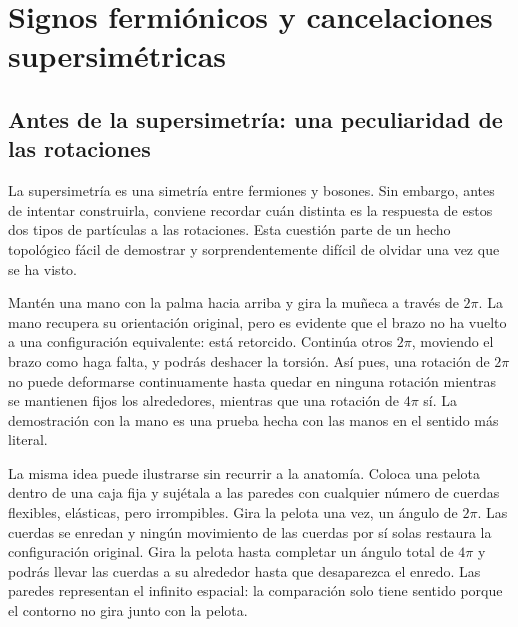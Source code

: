 \chapter{Signos fermiónicos y cancelaciones supersimétricas}


\section{Antes de la supersimetría: una peculiaridad de las rotaciones}

La supersimetría es una simetría entre fermiones y bosones. Sin embargo, antes de intentar construirla, conviene recordar cuán distinta es la respuesta de estos dos tipos de partículas a las rotaciones. Esta cuestión parte de un hecho topológico fácil de demostrar y sorprendentemente difícil de olvidar una vez que se ha visto.

Mantén una mano con la palma hacia arriba y gira la muñeca a través de \(2\pi\). La mano recupera su orientación original, pero es evidente que el brazo no ha vuelto a una configuración equivalente: está retorcido. Continúa otros \(2\pi\), moviendo el brazo como haga falta, y podrás deshacer la torsión. Así pues, una rotación de \(2\pi\) no puede deformarse continuamente hasta quedar en ninguna rotación mientras se mantienen fijos los alrededores, mientras que una rotación de \(4\pi\) sí. La demostración con la mano es una prueba hecha con las manos en el sentido más literal.

La misma idea puede ilustrarse sin recurrir a la anatomía. Coloca una pelota dentro de una caja fija y sujétala a las paredes con cualquier número de cuerdas flexibles, elásticas, pero irrompibles. Gira la pelota una vez, un ángulo de \(2\pi\). Las cuerdas se enredan y ningún movimiento de las cuerdas por sí solas restaura la configuración original. Gira la pelota hasta completar un ángulo total de \(4\pi\) y podrás llevar las cuerdas a su alrededor hasta que desaparezca el enredo. Las paredes representan el infinito espacial: la comparación solo tiene sentido porque el contorno no gira junto con la pelota.

